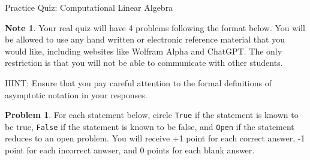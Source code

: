 \documentclass[10pt]{exam}
\theoremstyle{definition}
\newtheorem{problem}{Problem}
\newtheorem{note}{Note}
\begin{document}
\begin{center}
{
\Huge
    Practice Quiz: Computational Linear Algebra
}
\end{center}

\begin{note}
Your real quiz will have 4 problems following the format below.
You will be allowed to use any hand written or electronic reference material that you would like,
including websites like Wolfram Alpha and ChatGPT.
The only restriction is that you will not be able to communicate with other students.

HINT:
Ensure that you pay careful attention to the formal definitions of asymptotic notation in your responses.
\end{note}

\begin{problem}
    For each statement below,
    circle \texttt{True} if the statement is known to be true,
    \texttt{False} if the statement is known to be false,
    and \texttt{Open} if the statement reduces to an open problem.
    You will receive +1 point for each correct answer,
    -1 point for each incorrect anwser,
    and 0 points for each blank answer.



\end{problem}
\end{document}
